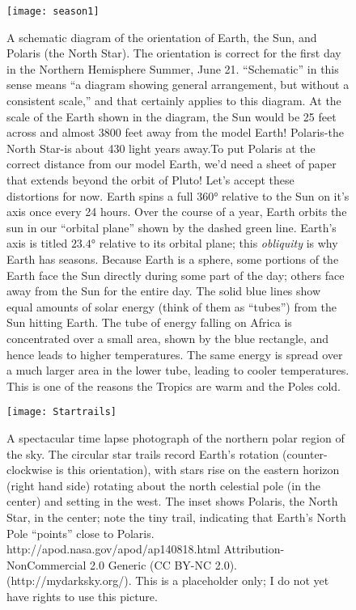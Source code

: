 \begin{figure}[p]
\centering
\texttt{[image: season1]}%
\caption{A schematic diagram of the orientation of Earth, the Sun, and Polaris (the North Star). The orientation is correct for the first day in the Northern Hemisphere Summer, June 21. ``Schematic'' in this sense means ``a diagram showing general arrangement, but without a consistent scale,'' and that certainly applies to this diagram. At the scale of the Earth shown in the diagram, the Sun would be 25 feet across and almost 3800 feet away from the model Earth! Polaris-the North Star-is about 430 light years away.To put Polaris at the correct distance from our model Earth, we'd need a sheet of paper that extends beyond the orbit of Pluto! Let's accept these distortions for now. Earth spins a full $\ang{360}$ relative to the Sun on it's axis once every 24 hours. Over the course of a year, Earth orbits the sun in our ``orbital plane'' shown by the dashed green line. Earth's axis is titled $\ang{23.4}$ relative to its orbital plane; this \emph{obliquity} is why Earth has seasons. Because Earth is a sphere, some portions of the Earth face the Sun directly during some part of the day; others face away from the Sun for the entire day. The solid blue lines show equal amounts of solar energy (think of them as ``tubes'') from the Sun hitting Earth. The tube of energy falling on Africa is concentrated over a small area, shown by the blue rectangle, and hence leads to higher temperatures. The same energy is spread over a much larger area in the lower tube, leading to cooler temperatures. This is one of the reasons the Tropics are warm and the Poles cold.}   
\label{fig:season1}
\end{figure}

\newpage
\begin{sidewaysfigure}
\centering
\texttt{[image: Startrails]}%
\caption{A spectacular time lapse photograph of the northern polar region of the sky. The circular star trails record Earth's rotation (counter-clockwise is this orientation), with stars rise on the eastern horizon (right hand side) rotating about the north celestial pole (in the center) and setting in the west. The inset shows Polaris, the North Star, in the center; note the tiny trail, indicating that Earth's North Pole ``points'' close to Polaris. http://apod.nasa.gov/apod/ap140818.html  Attribution-NonCommercial 2.0 Generic (CC BY-NC 2.0). (http://mydarksky.org/). This is a placeholder only; I do not yet have rights to use this picture. }
\label{fig:startrails}
\end{sidewaysfigure}

